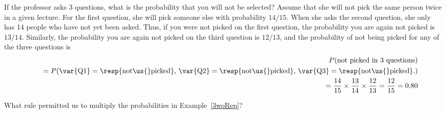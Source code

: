 \begin{examplewrap}
\begin{nexample}{If the professor asks 3 questions, what is the probability that you will not be selected? Assume that she will not pick the same person twice in a given lecture.}\label{3woRep}
For the first question, she will pick someone else with probability $14/15$. When she asks the second question, she only has 14 people who have not yet been asked. Thus, if you were not picked on the first question, the probability you are again not picked is $13/14$. Similarly, the probability you are again not picked on the third question is $12/13$, and the probability of not being picked for any of the three questions is
\begin{eqnarray*}
&&P(\text{not picked in 3 questions}) \\
&&\quad = P(\text{\var{Q1}} = \text{\resp{not\us{}picked}, }\text{\var{Q2}} = \text{\resp{not\us{}picked}, }\text{\var{Q3}} = \text{\resp{not\us{}picked}.}) \\
&&\quad = \frac{14}{15}\times\frac{13}{14}\times\frac{12}{13} = \frac{12}{15} = 0.80
\end{eqnarray*}
\end{nexample}
\end{examplewrap}

\begin{exercisewrap}
\begin{nexercise}
What rule permitted us to multiply the probabilities in Example~\ref{3woRep}?\footnotemark
\end{nexercise}
\end{exercisewrap}


